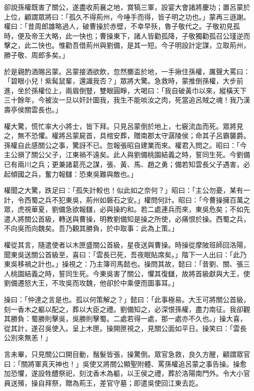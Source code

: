 卻說孫權既害了關公，遂盡收荊襄之地，賞犒三軍，設宴大會諸將慶功；置呂蒙於上位，顧謂眾將曰：「孤久不得荊州，今唾手而得，皆子明之功也。」蒙再三遜謝。權曰：「昔周郎雄略過人，破曹操於赤壁，不幸早殀，魯子敬代之。子敬初見孤時，便及帝王大略，此一快也；曹操東下，諸人皆勸孤降，子敬獨勸孤召公瑾逆而擊之，此二快也。惟勸吾借荊州與劉備，是其一短。今子明設計定謀，立取荊州，勝子敬、周郎多矣。」

於是親酌酒賜呂蒙。呂蒙接酒欲飲，忽然擲盃於地，一手揪住孫權，厲聲大罵曰：「碧眼小兒！紫髯鼠輩，還識我否？」眾將大驚。急救時，蒙推倒孫權，大步前進，坐於孫權位上，兩眉倒豎，雙眼圓睜，大喝曰：「我自破黃巾以來，縱橫天下三十餘年，今被汝一旦以奸計圖我，我生不能啖汝之肉，死當追呂賊之魂！我乃漢壽亭侯關雲長也。」

權大驚，慌忙率大小將士，皆下拜。只見呂蒙倒於地上，七竅流血而死。眾將見之，無不恐懼。權將呂蒙屍首，具棺安葬，贈南郡太守潺陵侯；命其子呂霸襲爵。孫權自此感關公之事，驚訝不已。忽報張昭自建業而來。權君入問之。昭曰：「今主公損了關公父子，江東禍不遠矣。此人與劉備桃園結義之時，誓同生死。今劉備已有兩川之兵；更兼諸葛亮之謀，張、黃、馬、趙之勇；備若知雲長父子遇害，必起傾國之兵，奮力報讎：恐東吳難與敵也。」

權聞之大驚，跌足曰：「孤失計較也！似此如之奈何？」昭曰：「主公勿憂，某有一計，令西蜀之兵不犯東吳，荊州如磐石之安。」權問何計。昭曰：「今曹操擁百萬之眾，虎視華夏，劉備急欲報讎，必與操約和。若二處連兵而來，東吳危矣；不如先遣人將關公首級，轉送與曹操，明教劉備知是操之所使，必痛恨於操。西蜀之兵，不向吳而向魏矣。吾乃觀其勝負，於中取事：此為上策。」

權從其言，隨遣使者以木匣盛關公首級，星夜送與曹操。時操從摩陂班師回洛陽，聞東吳送關公首級至，喜曰：「雲長已死，吾夜眠貼席矣。」階下一人出曰：「此乃東吳移禍之計也。」操視之：乃主簿司馬懿也。操問其故，懿曰：「昔劉、關、張三人桃園結義之時，誓同生死。今東吳害了關公，懼其復讎，故將首級獻與大王，使劉備遷怒大王，不攻吳而攻魏，他卻於中乘便而圖事耳。」

操曰：「仲達之言是也。孤以何策解之？」懿曰：「此事極易。大王可將關公首級，刻一香木之軀以配之，葬以大臣之禮。劉備知之，必深恨孫權，盡力南征。我卻觀其勝負：蜀勝則擊吳，吳勝則擊蜀。二處若得一處，那一處亦不久也。」操大喜，從其計，遂召吳使入。呈上木匣。操開匣視之，見關公面如平日。操笑曰：「雲長公別來無恙！」

言未畢，只見關公口開目動，鬚髮皆張，操驚倒。眾官急救，良久方醒，顧謂眾官曰：「關將軍真天神也！」吳使又將關公顯聖附體、罵孫權追呂蒙之事告操。操愈加恐懼，遂設牲醴祭祀，刻沈香木為軀，以王侯之禮，葬於洛陽南門外。令大小官員送殯，操自拜祭，贈為荊王，差官守墓；即遣吳使回江東去訖。

